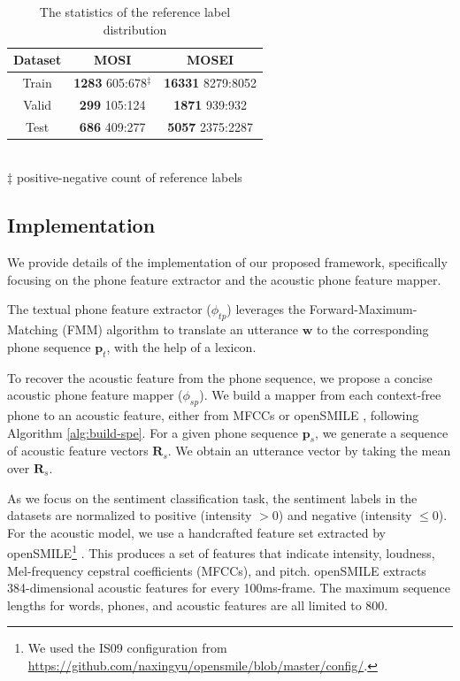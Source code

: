 \documentclass[11pt]{article}
\begin{document}
\begin{table}[!htp]
\centering
\small
\caption{The statistics of the reference label distribution}%
\begin{tabular}{c|c|c}
\toprule
\textbf{Dataset} & \textbf{MOSI} & \textbf{MOSEI} \\
\midrule
Train & {\textbf{1283} 605:678$^\ddag$} & {\textbf{16331} 8279:8052} \\
Valid & {\textbf{299} 105:124} & {\small \textbf{1871} 939:932}   \\
Test & {\textbf{686} 409:277} & {\small \textbf{5057} 2375:2287} \\
\bottomrule
\end{tabular}
\label{tab:data}
\\{\normalsize $\ddag$ positive-negative count of reference labels}
\end{table}

\subsection{Implementation}
\label{sec:imp}

We provide details of the implementation of our proposed framework, specifically focusing on the phone feature extractor and the acoustic phone feature mapper.

The textual phone feature extractor ($\phi_{tp}$) leverages the Forward-Maximum-Matching (FMM) algorithm to translate an utterance $\mathbf{w}$ to the corresponding phone sequence $\mathbf{p}_t$, with the help of a lexicon.

To recover the acoustic feature from the phone sequence, we propose a concise acoustic phone feature mapper ($\phi_{sp}$). We build a mapper from each context-free phone to an acoustic feature, either from MFCCs or openSMILE \cite{eyben2010opensmile}, following Algorithm \ref{alg:build-spe}. For a given phone sequence $\mathbf{p}_s$, we generate a sequence of acoustic feature vectors $\mathbf{R}_s$. We obtain an utterance vector by taking the mean over $\mathbf{R}_s$.

As we focus on the sentiment classification task, the sentiment labels in the datasets are normalized to positive (intensity $>0$) and negative (intensity $\leq0$). For the acoustic model, we use a handcrafted feature set extracted by openSMILE\footnote{We used the IS09 configuration from \url{https://github.com/naxingyu/opensmile/blob/master/config/}.} \cite{eyben2010opensmile}. This produces a set of features that indicate intensity, loudness, Mel-frequency cepstral coefficients (MFCCs), and pitch. openSMILE extracts 384-dimensional acoustic features for every 100ms-frame. The maximum sequence lengths for words, phones, and acoustic features are all limited to 800.
\end{document}
